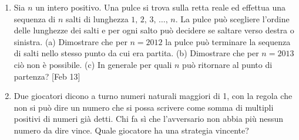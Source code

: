 \documentclass[a4paper]{article}
\theoremstyle{remark}
\theoremstyle{definition}
\newcommand{\subscript}[2]{$#1  #2$}
\begin{document}
\begin{enumerate}[label=(\subscript{d}{\arabic*})]
	\item Sia $ n $ un intero positivo. Una pulce si trova sulla retta reale ed effettua una sequenza di $ n $ salti
	di lunghezza $ 1,\, 2,\, 3,\,\dots ,\,n $. La pulce può scegliere l’ordine delle lunghezze dei salti e per ogni salto
	può decidere se saltare verso destra o sinistra.
	(a) Dimostrare che per $ n = 2012 $ la pulce può terminare la sequenza di salti nello stesso punto
	da cui era partita.
	(b) Dimostrare che per $ n = 2013 $ ciò non è possibile.
	(c) In generale per quali $ n $ può ritornare al punto di partenza? [Feb 13]
	
	\item  Due giocatori dicono a turno numeri naturali maggiori di 1, con la regola che non si
	può dire un numero che si possa scrivere come somma di multipli positivi di numeri
	già detti. Chi fa sì che l’avversario non abbia più nessun numero da dire vince. Quale
	giocatore ha una strategia vincente?
\end{enumerate}
\end{document}
